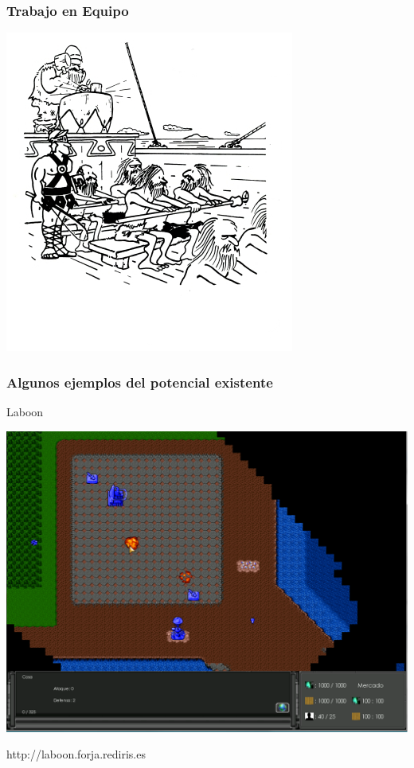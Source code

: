 
\begin{frame}
	\frametitle{Trabajo en Equipo}
	
	\begin{center}
		\includegraphics[scale=0.70]{img/equipo.jpg}
	\end{center}

\end{frame}


\begin{frame}
	\frametitle{Algunos ejemplos del potencial existente}
	
	\begin{center}
	Laboon	
	
		\includegraphics[scale=0.22]{img/laboon.png}
		
	http://laboon.forja.rediris.es
	\end{center}

\end{frame}

